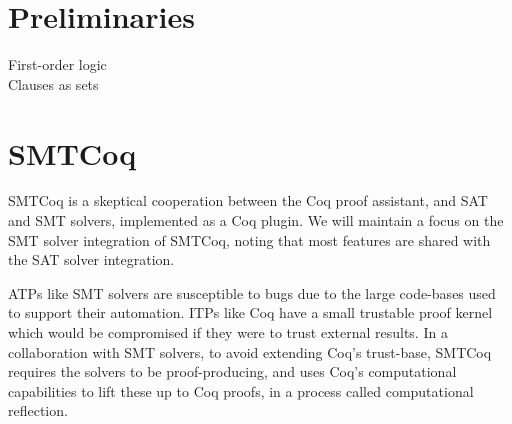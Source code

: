 \documentclass{article}
\begin{document}
\section{Preliminaries}
\label{sec:prelims}
	First-order logic\\
	Clauses as sets\\

\section{SMTCoq}
\label{sec:smtcoq}
	SMTCoq is a skeptical cooperation 
	between the Coq proof assistant, and 
	SAT and SMT solvers, implemented as a 
	Coq plugin. We will maintain a focus 
	on the SMT solver integration of 
	SMTCoq, noting that most features are 
	shared with the SAT	solver integration.
	
	ATPs like SMT solvers are susceptible 
	to bugs due to the large code-bases 
	used to support	their automation. 
	ITPs like Coq have a small trustable 
	proof kernel which would be 
	compromised if they were to trust
	external results. In a collaboration
	with SMT solvers, to avoid extending 
	Coq's trust-base, SMTCoq requires the 
	solvers to be proof-producing, and uses 
	Coq's computational capabilities 
	to lift these up to Coq proofs, in a 
	process called computational 
	reflection.
	
\end{document}
